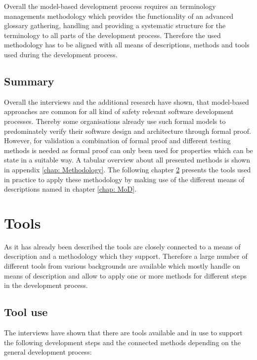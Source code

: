 \documentclass{./template/openetcs_report}
\begin{document}
Overall the model-based development process requires an terminology managements methodology which provides the functionality of an advanced glossary gathering, handling and providing a systematic structure for the terminology to all parts of the development process. Therefore the used methodology has to be aligned with all means of descriptions, methods and tools used during the development process. 

\section{Summary}

Overall the interviews and the additional research have shown, that model-based approaches are common for all kind of safety relevant software development processes. Thereby some organisations already use such formal models to predominately verify their software design and architecture through formal proof. However, for validation a combination of formal proof and different testing methods is needed as formal proof can only been used for properties which can be state in a suitable way. A tabular overview about all presented methods is shown in appendix \ref{chap: Methodology}. The following chapter \ref{chap: tools} presents the tools used in practice to apply these methodology by making use of the different means of descriptions named in chapter \ref{chap: MoD}.


\chapter{Tools}

\label{chap: tools}

As it has already been described the tools are closely connected to a means of description  and a methodology which they support. Therefore a large number of different tools from various backgrounds are available which mostly handle on means of description and allow to apply one or more methods for different steps in the development process.

\section{Tool use}

The interviews have shown that there are tools available and in use to support the following development steps and the connected methods depending on the general development process:
\end{document}
